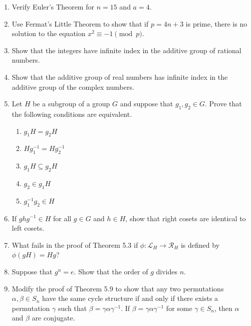 {\begin{enumerate}
\item
Verify Euler's Theorem for $n = 15$ and $a = 4$.

\item
Use Fermat's Little Theorem to show that if $p= 4n+3$ is prime, there is no solution to the equation $x^2 \equiv -1 \pmod{p}$.
 
\item
Show that the integers have infinite index in the additive group of rational numbers.
 
\item
Show that the additive group of real numbers has infinite index in the additive group of the complex numbers.
 
\item
Let $H$ be a subgroup of a group $G$ and suppose that $g_1, g_2 \in G$.  Prove that the following conditions are equivalent.
\begin{enumerate}
 
\item
$g_1 H = g_2 H$
 
\item
$H g_1^{-1}  = H g_2^{-1}$
 
\item
$g_1 H \subseteq g_2 H$
 
\item
$g_2 \in g_1 H$
 
\item
$g_1^{-1} g_2 \in H$
 
\end{enumerate}
 
\item
If $ghg^{-1} \in H$ for all $g \in G$ and $h \in H$, show that right cosets are identical to left cosets.
 
\item
What fails in the proof of Theorem 5.3 if $\phi :  {\mathcal L}_H \rightarrow {\mathcal R}_H$ is defined by $\phi( gH ) = Hg$?
 
\item
Suppose that $g^n = e$. Show that the order of $g$ divides
$n$.
 
\item
Modify the proof of Theorem 5.9 to show that any two permutations $\alpha, \beta \in S_n$ have the same cycle structure if and only if there exists a  permutation $\gamma$ such that $\beta = \gamma \alpha \gamma^{-1}$.  If $\beta = \gamma \alpha \gamma^{-1}$ for some $\gamma \in S_n$, then $\alpha$ and $\beta$ are {\bfi conjugate}.


\end{enumerate}}
